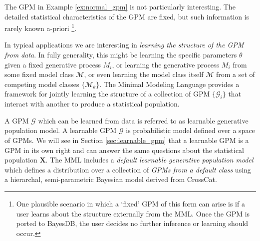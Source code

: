 \documentclass[10pt,letterpaper]{article}
\newcommand{\set}[1]{\{#1\}}
\begin{document}
The GPM in Example \ref{ex:normal_gpm} is not particularly
interesting. The detailed statistical characteristics of the GPM are
fixed, but such information is rarely known a-priori
\footnote{One plausible
scenario in which a `fixed' GPM of this form can arise is if a user
learns about the structure externally from the MML. Once the GPM
is ported to BayesDB, the user decides no further inference or learning should
occur.}.

In typical applications we are interesting in \textit{learning the structure of
the GPM from data}. In fully generality, this might be learning the
specific parameters $\theta$ given a fixed generative process $M_i$, or learning the generative process $M_i$ from some fixed model class $\mathcal{M}$, or even learning the model class itself $\mathcal{M}$ from a set of competing model classes $\set{\mathcal{M}_k}$. The Minimal Modeling Language provides a framework for jointly
learning the structure of a collection of GPM $\set{\mathcal{G}_i}$ that
interact with another to produce a statistical population.

A GPM $\mathcal{G}$ which can be learned from data is referred to as learnable generative population model. A learnable GPM $\mathcal{G}$ is probabilistic model defined over a space of GPMs. We will see in Section
\ref{sec:learnable_gpm} that a learnable GPM is a GPM in its own right and can answer the same questions about the statistical population $\mathbf{X}$. The MML includes a
\textit{default learnable generative population model} which defines a distribution over a collection of
\textit{GPMs from a default class} using a hierarchal, semi-parametric Bayesian model derived from CrossCat.
\end{document}
